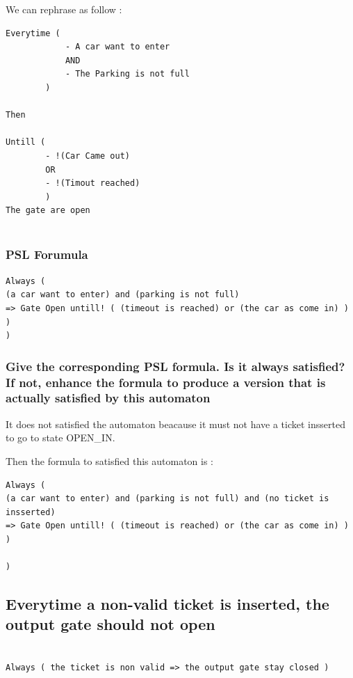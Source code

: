 \documentclass{article}
\begin{document}
We can rephrase as follow :
\begin{verbatim}
Everytime (
			- A car want to enter
			AND
			- The Parking is not full
		)
		
Then 

Untill ( 
		- !(Car Came out)
		OR
		- !(Timout reached)
		)
The gate are open
	
\end{verbatim}


\subsubsection{PSL Forumula}

\begin{verbatim}
Always ( 
(a car want to enter) and (parking is not full) 
=> Gate Open untill! ( (timeout is reached) or (the car as come in) )
) 
)
\end{verbatim}
\subsubsection{Give the corresponding PSL formula. Is it always satisfied? If not, enhance the formula to produce a version that is actually satisfied by this automaton}

It does not satisfied the automaton beacause it must not have a ticket insserted to go to state OPEN\_IN.

Then the formula to satisfied this automaton is :


\begin{verbatim}
Always ( 
(a car want to enter) and (parking is not full) and (no ticket is insserted) 
=> Gate Open untill! ( (timeout is reached) or (the car as come in) )
) 

)
\end{verbatim}



\subsection{Everytime a non-valid ticket is inserted, the output gate should not open }

\begin{verbatim}

Always ( the ticket is non valid => the output gate stay closed ) 


\end{verbatim}

 
\end{document}
